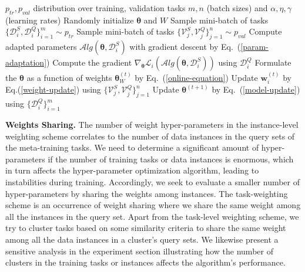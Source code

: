 \begin{algorithm}[t]
\small
\caption{\sysname{}}
\begin{algorithmic}[1]
\label{alg-RWMAML}
\REQUIRE $p_{tr}, p_{val}$ distribution over training, validation tasks
\REQUIRE $m,n$ (batch sizes) and $\alpha, \eta, \gamma$ (learning rates)
\STATE Randomly initialize $\boldsymbol{\theta}$ and $W$
\STATE Sample mini-batch of tasks $\{\mathcal{D}_i^{S},\mathcal{D}_i^{Q}\}_{i=1}^{m} \sim p_{tr}$
\STATE Sample mini-batch of tasks $\{\mathcal{V}_j^{S},\mathcal{V}_j^{Q}\}_{j=1}^{n} \sim p_{val}$
\STATE Compute adapted parameters $\mathcal{A}lg(\boldsymbol{\theta},\mathcal{D}_i^{S})$ with gradient descent by Eq.~(\ref{param-adaptation}) 
\STATE Compute the gradient $\nabla_{\boldsymbol{\theta}} \mathcal{L}_i(\mathcal{A}lg(\boldsymbol{\theta},\mathcal{D}_i^{S}))$ using $\mathcal{D}_i^{Q}$
\STATE Formulate the $\boldsymbol{\theta}$ as a function of weights $\boldsymbol{\theta}_{W}^{(t)}$ by Eq.~(\ref{online-equation})
\STATE Update $\mathbf{w}_i^{(t)}$ by Eq.(\ref{weight-update}) using $\{\mathcal{V}_j^{S},\mathcal{V}_j^{Q}\}_{j=1}^{n}$
\ENDFOR
\STATE Update $\boldsymbol{\theta}^{(t+1)}$ by Eq.~(\ref{model-update}) using $\{\mathcal{D}_i^{Q}\}_{i=1}^{m}$
\ENDWHILE
\end{algorithmic}
\end{algorithm}
\setlength{\textfloatsep}{5pt}%

\noindent \textbf{Weights Sharing.} The number of weight hyper-parameters in the instance-level weighting scheme correlates to the number of data instances in the query sets of the meta-training tasks. We need to determine a significant amount of hyper-parameters if the number of training tasks or data instances is enormous, which in turn affects the hyper-parameter optimization algorithm, leading to instabilities during training. Accordingly, we seek to evaluate a smaller number of hyper-parameters by sharing the weights among instances. The task-weighting scheme is an occurrence of weight sharing where we share the same weight among all the instances in the query set. Apart from the task-level weighting scheme, we try to cluster tasks based on some similarity criteria to share the same weight among all the data instances in a cluster's query sets. We likewise present a sensitive analysis in the experiment section illustrating how the number of clusters in the training tasks or instances affects the \sysname{} algorithm's performance.

